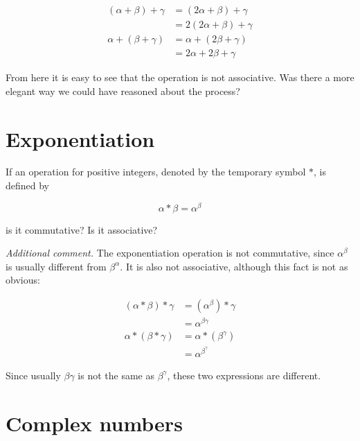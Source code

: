 \begin{align}
    (\alpha \boxed{+} \beta) \boxed{+} \gamma & = (2\alpha + \beta) \boxed{+} \gamma \\
                                              & = 2(2\alpha + \beta) + \gamma        \\
    \alpha \boxed{+} (\beta \boxed{+} \gamma) & = \alpha \boxed{+} (2\beta + \gamma) \\
                                              & = 2\alpha + 2\beta + \gamma
\end{align}

From here it is easy to see that the operation is not associative. Was there a more elegant way we could have reasoned about the process?

\section{Exponentiation}

\begin{problem}
If an operation for positive integers, denoted by the temporary symbol $\ast$, is defined by

\begin{equation}
    \alpha \ast \beta = \alpha^\beta
\end{equation}

is it commutative? Is it associative?
\end{problem}

\textit{Additional comment.} The exponentiation operation is not commutative, since $\alpha^\beta$ is usually different from $\beta^\alpha$. It is also not associative, although this fact is not as obvious:

\begin{align}
    (\alpha \ast \beta) \ast \gamma & = (\alpha^\beta)\ast\gamma   \\
                                    & = \alpha^{\beta\gamma}       \\
    \alpha \ast (\beta \ast \gamma) & = \alpha \ast (\beta^\gamma) \\
                                    & = \alpha^{\beta^\gamma}
\end{align}

Since usually $\beta\gamma$ is not the same as $\beta^\gamma$, these two expressions are different.

\section{Complex numbers}

